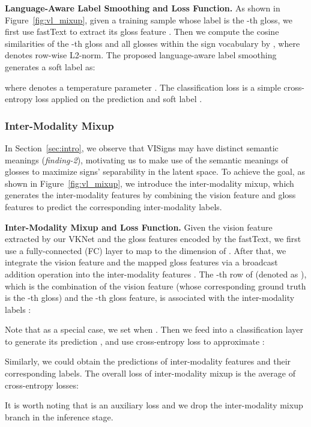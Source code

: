 \documentclass[10pt,twocolumn,letterpaper]{article}
\begin{document}
\noindent\textbf{Language-Aware Label Smoothing and Loss Function.} As shown in Figure~\ref{fig:vl_mixup}, given a training sample whose label is the -th gloss, we first use fastText to extract its gloss feature . Then we compute the cosine similarities of the -th gloss and all  glosses within the sign vocabulary by , where  denotes row-wise L2-norm. The proposed language-aware label smoothing generates a soft label  as:

where  denotes a temperature parameter \cite{chen2020simple}.
The classification loss  is a simple cross-entropy loss applied on the prediction and soft label .




\vspace{-4mm}
\subsubsection{Inter-Modality Mixup}
\vspace{-2mm}
\label{sec:vl_mixup}
In Section~\ref{sec:intro}, we observe that VISigns may have distinct semantic meanings (\textit{finding-2}), motivating us to make use of the semantic meanings of glosses to maximize signs' separability in the latent space. To achieve the goal, as shown in Figure~\ref{fig:vl_mixup}, we introduce the inter-modality mixup, which generates the inter-modality features by combining the vision feature and gloss features to predict the corresponding inter-modality labels.


\noindent\textbf{Inter-Modality Mixup and Loss Function.} Given the vision feature  extracted by our VKNet and the gloss features  encoded by the fastText, we first use a fully-connected (FC) layer to map  to the dimension of . After that, we integrate the vision feature  and the mapped gloss features  via a broadcast addition operation into the inter-modality features . The -th row of  (denoted as ), which is the combination of the vision feature (whose corresponding ground truth is the -th gloss) and the -th gloss feature, is associated with the inter-modality labels :

Note that as a special case, we set  when . Then we feed  into a classification layer to generate its prediction , and use cross-entropy loss to approximate :

Similarly, we could obtain the predictions of  inter-modality features and their corresponding labels. The overall loss of inter-modality mixup is the average of  cross-entropy losses:

It is worth noting that  is an auxiliary loss and we drop the inter-modality mixup branch in the inference stage.
\end{document}
